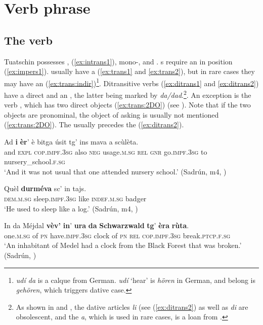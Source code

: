 \chapter{Verb phrase}


\section{The verb}\label{sec:4.1}
Tuatschin possesses ,  (\ref{ex:intrans1}), mono-, and . s require an  in  position (\ref{ex:impers1}).  usually have a  (\ref{ex:trans1} and \ref{ex:trans2}), but in rare cases they may have an  (\ref{ex:trans:indir})\footnote{\textit{udí da} is a calque from German. \textit{udí} `hear' is \textit{hören} in German, and belong is \textit{gehören}, which triggers dative case.}. Ditransitive verbs (\ref{ex:ditrans1} and \ref{ex:ditrans2}) have a direct and an , the latter being marked by \textit{da/dad}.\footnote{As shown in  and , the dative articles \textit{li} (see (\ref{ex:ditrans2}) as well as \textit{di} are obsolescent, and the  \textit{a}, which is used in rare cases, is a loan from .}. An exception is the verb , which has two direct objects (\ref{ex:trans:2DO}) (see ). Note that if the two objects are pronominal, the object of asking is usually not mentioned (\ref{ex:trans:2DO}). The  usually precedes the  (\ref{ex:ditrans2}).

\ea
\label{ex:impers1}
\gll Ad \textbf{i} \textbf{èr}’ è bitga úsit tg’ ins mava a scùlèta.\\
and  \textsc{expl} \textsc{cop.impf.3sg} also \textsc{neg} usage.\textsc{m.sg}  \textsc{rel} \textsc{gnr} go.\textsc{impf.3sg} to nursery\_school.\textsc{f.sg}\\
\glt `And it was not usual that one attended nursery school.' (Sadrún, m4, )
\z

\ea
\label{ex:intrans1}
\gll  Quèl \textbf{durméva} sc’ in tajs.  \\
\textsc{dem.m.sg} sleep.\textsc{impf.3sg} like \textsc{indef.m.sg} badger\\
\glt `He used to sleep like a log.' (Sadrún, m4, )
\z

\ea\label{ex:trans1}
\gll    In da Méjdal \textbf{vèv'} {\ob}\textbf{in}' \textbf{ura} \textbf{da} \textbf{Schwarzwald} \textbf{tg}' \textbf{èra} \textbf{rùta}{\cb}.\\
     one.\textsc{m.sg} of \textsc{pn} have.\textsc{impf.3sg} \textsc{} clock of \textsc{pn} \textsc{rel} \textsc{cop.impf.3sg} break.\textsc{ptcp.f.sg}\\
\glt `An inhabitant of Medel had a clock from the Black Forest that was broken.' (Sadrún, \citealt[106]{Büchli1966})
\z

